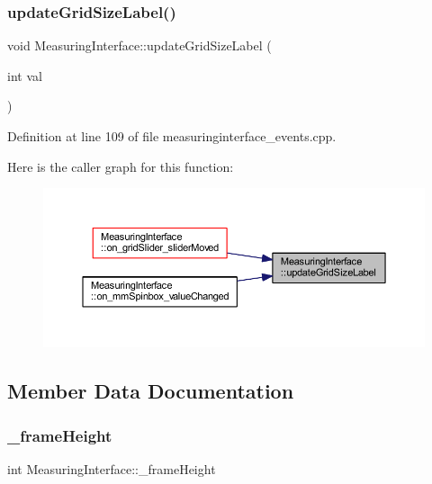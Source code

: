 \subsubsection{\texorpdfstring{updateGridSizeLabel()}{updateGridSizeLabel()}}
{\footnotesize\ttfamily void Measuring\+Interface\+::update\+Grid\+Size\+Label (\begin{DoxyParamCaption}\item[{int}]{val }\end{DoxyParamCaption})\hspace{0.3cm}{\ttfamily [private]}}



Definition at line 109 of file measuringinterface\+\_\+events.\+cpp.

Here is the caller graph for this function\+:
\nopagebreak
\begin{figure}[H]
\begin{center}
\leavevmode
\includegraphics[width=350pt]{class_measuring_interface_a049b5fba322e426db13761cf8d66f8a2_icgraph}
\end{center}
\end{figure}


\subsection{Member Data Documentation}
\mbox{\label{class_measuring_interface_ad5df82a497791ea7bbf03548f389cb5b}} 
\subsubsection{\texorpdfstring{\_frameHeight}{\_frameHeight}}
{\footnotesize\ttfamily int Measuring\+Interface\+::\+\_\+frame\+Height\hspace{0.3cm}{\ttfamily [private]}}



